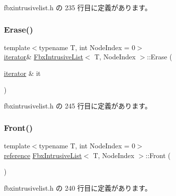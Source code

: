  fbxintrusivelist.\+h の 235 行目に定義があります。

\mbox{\label{class_fbx_intrusive_list_a730189544745e9cb520294375d674b5b}} 
\subsubsection{\texorpdfstring{Erase()}{Erase()}}
{\footnotesize\ttfamily template$<$typename T, int Node\+Index = 0$>$ \\
\hyperlink{class_fbx_intrusive_list_ae1012cd86e3ff0a4a49c982f0d34b4e7}{iterator}\& \hyperlink{class_fbx_intrusive_list}{Fbx\+Intrusive\+List}$<$ T, Node\+Index $>$\+::Erase (\begin{DoxyParamCaption}\item[{\hyperlink{class_fbx_intrusive_list_ae1012cd86e3ff0a4a49c982f0d34b4e7}{iterator} \&}]{it }\end{DoxyParamCaption})\hspace{0.3cm}{\ttfamily [inline]}}



 fbxintrusivelist.\+h の 245 行目に定義があります。

\mbox{\label{class_fbx_intrusive_list_ab7ce2bb2018919a9631c76c2027fbb58}} 
\subsubsection{\texorpdfstring{Front()}{Front()}\hspace{0.1cm}{\footnotesize\ttfamily [1/2]}}
{\footnotesize\ttfamily template$<$typename T, int Node\+Index = 0$>$ \\
\hyperlink{class_fbx_intrusive_list_aa927f048081371fe74dff673d3a5a8ad}{reference} \hyperlink{class_fbx_intrusive_list}{Fbx\+Intrusive\+List}$<$ T, Node\+Index $>$\+::Front (\begin{DoxyParamCaption}{ }\end{DoxyParamCaption})\hspace{0.3cm}{\ttfamily [inline]}}



 fbxintrusivelist.\+h の 240 行目に定義があります。

